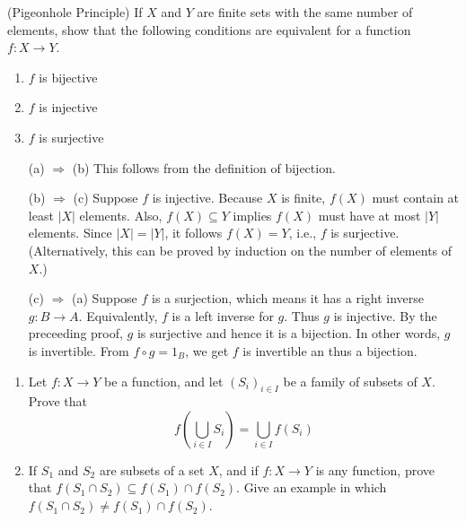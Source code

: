\begin{questions}
\question
    (Pigeonhole Principle)
    If \(X\) and \(Y\) are finite sets with the same number of elements, show that the following conditions are equivalent for a function \(f\colon X \rightarrow Y\).
    \begin{enumerate}[label=(\alph*)]
        \item \(f\) is bijective
        \item \(f\) is injective
        \item \(f\) is surjective
    \end{enumerate}
\begin{theproof} \hfill
\begin{itemize}[left=0.7in]
    \item[(a) \(\Rightarrow\) (b)] This follows from the definition of bijection.
    
    \item[(b) \(\Rightarrow\) (c)] Suppose \(f\) is injective. 
    Because \(X\) is finite, \(f(X)\) must contain at least \(|X|\) elements. Also, \(f(X)\subseteq Y\) implies \(f(X)\) must have  at most \(|Y|\) elements. Since \(|X| = |Y|\), it follows  \(f(X) = Y\), i.e., \(f\) is surjective.
    (Alternatively, this can be proved by induction on the number of elements of \(X\).)
    
    \item[(c) \(\Rightarrow\) (a)] Suppose \(f\) is a surjection, which means it has a right inverse \(g\colon B\to A\). 
    Equivalently,  \(f\) is a left inverse for \(g\). 
    Thus \(g\) is injective. By the preceeding proof, \(g\) is surjective and hence it is a bijection. In other words, \(g\) is invertible.
    From \(f\circ g = 1_B\), we get \(f\)  is invertible an thus a bijection.
\end{itemize}

\end{theproof}


\question
    \begin{enumerate}[label=(\alph*)]
        \item Let \(f: X \rightarrow Y\) be a function, and let \((S_i)_{i\in I}\) be a family of subsets of \(X\). Prove that
\[
f\left(\bigcup_{i \in I} S_i\right)=\bigcup_{i \in I} f\left(S_i\right)
\]

        \item If \(S_1\) and \(S_2\) are subsets of a set \(X\), and if \(f\colon X \rightarrow Y\) is any function, prove that \(f\left(S_1 \cap S_2\right) \subseteq f\left(S_1\right) \cap f\left(S_2\right)\). Give an example in which \(f\left(S_1 \cap S_2\right) \neq f\left(S_1\right) \cap f\left(S_2\right)\).
        

\end{enumerate}
\end{questions}
